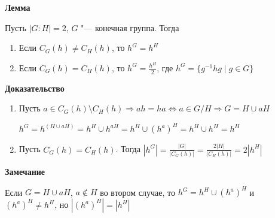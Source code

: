 \documentclass{article}
\begin{document}
\vspace{10pt}

\textbf{Лемма}

Пусть $|G:H| = 2$, $G$ "--- конечная группа. Тогда
\begin{enumerate}
	\item Если $C_G(h) \neq C_H(h)$, то $h^G = h^H$
	\item Если $C_G(h) = C_H(h)$, то $h^G = \frac{h^H}{2}$, где $h^G = \{g^{-1}hg \mid g \in G\}$
\end{enumerate}

\textbf{Доказательство}
\begin{enumerate}
	\item Пусть $a \in C_G(h) \setminus C_H(h) \Rightarrow ah = ha \Leftrightarrow a \in G/H \Rightarrow G = H \cup aH$
	
	$h^G = h^{(H \cup aH)} = h^H \cup h^{aH} = h^H \cup (h^a)^H = h^H \cup h^H = h^H$
	
	\item Пусть $C_G(h) = C_H(h)$. Тогда $|h^G| = \frac{|G|}{|C_G(h)|} = \frac{2|H|}{|C_H(h)|} = 2|h^H|$

\end{enumerate}

\vspace{10pt}

\textbf{Замечание}

Если $G = H \cup aH$, $a \notin H$ во втором случае, то $h^G = h^H \cup (h^a)^H$ и $(h^a)^H \neq h^H$, но $|(h^a)^H| = |h^H|$
\end{document}
